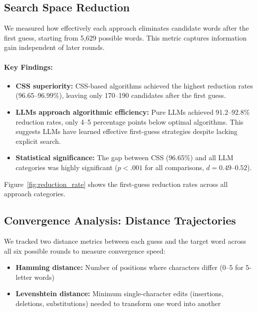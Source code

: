 \subsection{Search Space Reduction}

We measured how effectively each approach eliminates candidate words after the first guess, starting from 5,629 possible words. This metric captures information gain independent of later rounds.

\paragraph{Key Findings:}
\begin{itemize}
    \item \textbf{CSS superiority:} CSS-based algorithms achieved the highest reduction rates (96.65--96.99\%), leaving only 170--190 candidates after the first guess.
    \item \textbf{LLMs approach algorithmic efficiency:} Pure LLMs achieved 91.2--92.8\% reduction rates, only 4--5 percentage points below optimal algorithms. This suggests LLMs have learned effective first-guess strategies despite lacking explicit search.
    \item \textbf{Statistical significance:} The gap between CSS (96.65\%) and all LLM categories was highly significant ($p < .001$ for all comparisons, $d = 0.49$--$0.52$).
\end{itemize}

Figure~\ref{fig:reduction_rate} shows the first-guess reduction rates across all approach categories.

\subsection{Convergence Analysis: Distance Trajectories}

We tracked two distance metrics between each guess and the target word across all six possible rounds to measure convergence speed:
\begin{itemize}
    \item \textbf{Hamming distance:} Number of positions where characters differ (0--5 for 5-letter words)
    \item \textbf{Levenshtein distance:} Minimum single-character edits (insertions, deletions, substitutions) needed to transform one word into another
\end{itemize}

